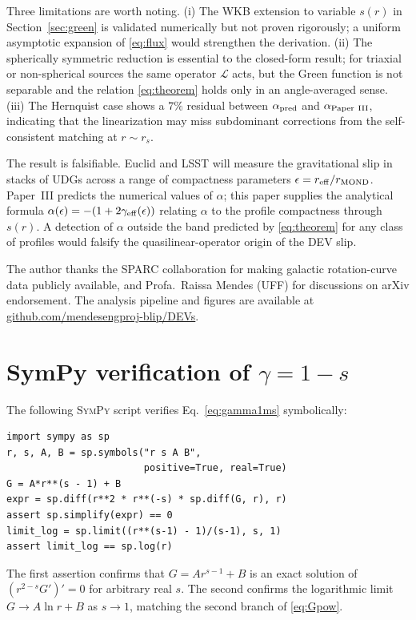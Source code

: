 \documentclass[aps,prd,twocolumn,superscriptaddress,nofootinbib]{revtex4-2}
\begin{document}
Three limitations are worth noting. (i) The WKB extension to
variable $s(r)$ in Section~\ref{sec:green} is validated numerically
but not proven rigorously; a uniform asymptotic expansion of
\eqref{eq:flux} would strengthen the derivation. (ii) The
spherically symmetric reduction is essential to the closed-form
result; for triaxial or non-spherical sources the same operator
$\mathcal{L}$ acts, but the Green function is not separable and the
relation \eqref{eq:theorem} holds only in an angle-averaged sense.
(iii) The Hernquist case shows a $7\%$ residual between
$\alpha_{\rm pred}$ and $\alpha_{\rm Paper~III}$, indicating that
the linearization may miss subdominant corrections from the
self-consistent matching at $r\sim r_s$.

The result is falsifiable. Euclid and LSST will measure the
gravitational slip in stacks of UDGs across a range of compactness
parameters $\epsilon = r_{\rm eff}/r_{\rm MOND}$. Paper~III
predicts the numerical values of $\alpha$; this paper supplies the
analytical formula $\alpha(\epsilon) = -(1 + 2\gamma_{\rm eff}(\epsilon))$
relating $\alpha$ to the profile compactness through $s(r)$. A
detection of $\alpha$ outside the band predicted by
\eqref{eq:theorem} for any class of profiles would falsify the
quasilinear-operator origin of the DEV slip.

\begin{acknowledgments}
The author thanks the SPARC collaboration for making galactic
rotation-curve data publicly available, and Profa.\ Raissa Mendes
(UFF) for discussions on arXiv endorsement. The analysis pipeline
and figures are available at
\href{https://github.com/mendesengproj-blip/DEVs}{github.com/mendesengproj-blip/DEVs}.
\end{acknowledgments}

\appendix

\section{SymPy verification of $\gamma = 1-s$}\label{app:sympy}

The following \textsc{SymPy} script verifies
Eq.~\eqref{eq:gamma1ms} symbolically:
\begin{verbatim}
import sympy as sp
r, s, A, B = sp.symbols("r s A B",
                        positive=True, real=True)
G = A*r**(s - 1) + B
expr = sp.diff(r**2 * r**(-s) * sp.diff(G, r), r)
assert sp.simplify(expr) == 0
limit_log = sp.limit((r**(s-1) - 1)/(s-1), s, 1)
assert limit_log == sp.log(r)
\end{verbatim}
The first assertion confirms that $G = A r^{s-1} + B$ is an exact
solution of $(r^{2-s} G')' = 0$ for arbitrary real $s$. The second
confirms the logarithmic limit $G\to A\ln r + B$ as $s\to 1$,
matching the second branch of \eqref{eq:Gpow}.
\end{document}
